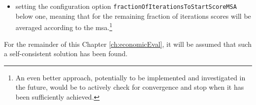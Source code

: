 \begin{oframed}
\begin{itemize}
\item setting the configuration option \verb$fractionOfIterationsToStartScoreMSA$ below one, meaning that for the remaining fraction of iterations scores will be averaged according to the \gls{msa}.\footnote{%
%
An even better approach, potentially to be implemented and investigated in the future, would be to actively check for convergence and stop when it has been sufficiently achieved.
%
%
}
\end{itemize}
%
For the remainder of this Chapter \ref{ch:economicEval}, it will be assumed that such a self-consistent solution has been found.
%

%


\end{oframed}
